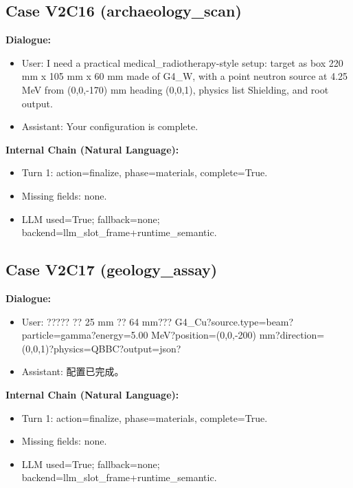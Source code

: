 \documentclass[11pt]{ctexart}
\begin{document}
\subsection{Case V2C16 (archaeology\_scan)}
\textbf{Dialogue:}
\begin{itemize}
\item User: I need a practical medical\_radiotherapy-style setup: target as box 220 mm x 105 mm x 60 mm made of G4\_W, with a point neutron source at 4.25 MeV from (0,0,-170) mm heading (0,0,1), physics list Shielding, and root output.
\item Assistant: Your configuration is complete.
\end{itemize}
\textbf{Internal Chain (Natural Language):}
\begin{itemize}
\item Turn 1: action=finalize, phase=materials, complete=True.
\item Missing fields: none.
\item LLM used=True; fallback=none; backend=llm\_slot\_frame+runtime\_semantic.
\end{itemize}
\subsection{Case V2C17 (geology\_assay)}
\textbf{Dialogue:}
\begin{itemize}
\item User: ????? ?? 25 mm ?? 64 mm??? G4\_Cu?source.type=beam?particle=gamma?energy=5.00 MeV?position=(0,0,-200) mm?direction=(0,0,1)?physics=QBBC?output=json?
\item Assistant: 配置已完成。
\end{itemize}
\textbf{Internal Chain (Natural Language):}
\begin{itemize}
\item Turn 1: action=finalize, phase=materials, complete=True.
\item Missing fields: none.
\item LLM used=True; fallback=none; backend=llm\_slot\_frame+runtime\_semantic.
\end{itemize}
\end{document}
